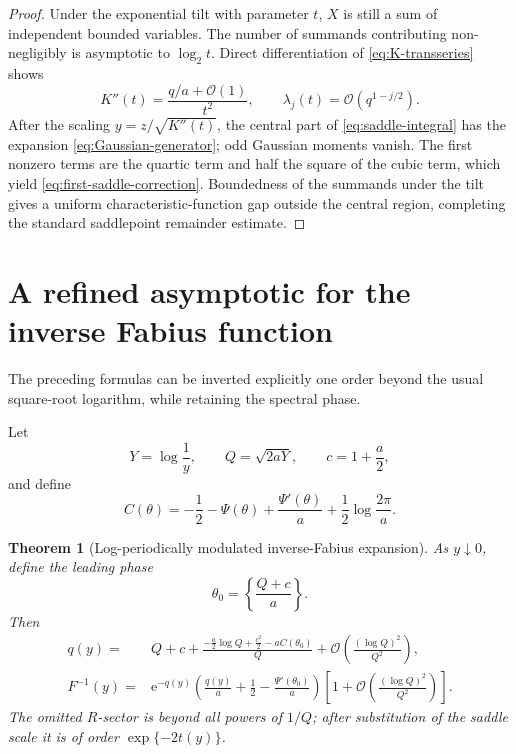 \documentclass[11pt,oneside]{article}
\newtheorem{theorem}{Theorem}[section]
\theoremstyle{definition}
\theoremstyle{remark}
\newcommand{\e}{\mathrm e}
\newcommand{\bigO}{\mathcal O}
\begin{document}
\begin{proof}
Under the exponential tilt with parameter \(t\), \(X\) is still a sum of
independent bounded variables.  The number of summands contributing
non-negligibly is asymptotic to \(\log_2t\).  Direct differentiation of
\eqref{eq:K-transseries} shows
\[
 K''(t)=\frac{q/a+\bigO(1)}{t^2},\qquad
 \lambda_j(t)=\bigO(q^{1-j/2}).
\]
After the scaling \(y=z/\sqrt{K''(t)}\), the central part of
\eqref{eq:saddle-integral} has the expansion
\eqref{eq:Gaussian-generator}; odd Gaussian moments vanish.  The first
nonzero terms are the quartic term and half the square of the cubic term,
which yield \eqref{eq:first-saddle-correction}.  Boundedness of the summands
under the tilt gives a uniform characteristic-function gap outside the
central region, completing the standard saddlepoint remainder estimate.
\end{proof}

\section{A refined asymptotic for the inverse Fabius function}

The preceding formulas can be inverted explicitly one order beyond the usual
square-root logarithm, while retaining the spectral phase.

Let
\[
 Y=\log\frac1y,\qquad
 Q=\sqrt{2aY},\qquad
 c=1+\frac a2,
\]
and define
\begin{equation}
 C(\theta)
 =-\frac12-\Psi(\theta)
   +\frac{\Psi'(\theta)}a
   +\frac12\log\frac{2\pi}{a}.
 \label{eq:Ctheta}
\end{equation}

\begin{theorem}[Log-periodically modulated inverse-Fabius expansion]
\label{thm:inverse-Fabius}
As \(y\downarrow0\), define the leading phase
\[
 \theta_0=
 \left\{\frac{Q+c}{a}\right\}.
\]
Then
\begin{align}
 q(y)
 ={}&
 Q+c+
 \frac{
  -\frac a2\log Q+\frac{c^2}{2}-aC(\theta_0)
 }{Q}
 +\bigO\!\left(\frac{(\log Q)^2}{Q^2}\right),
 \label{eq:q-inverse}\\
 F^{-1}(y)
 ={}&
 \e^{-q(y)}
 \left(
  \frac{q(y)}a+\frac12
  -\frac{\Psi'(\theta_0)}a
 \right)
 \left[
  1+\bigO\!\left(\frac{(\log Q)^2}{Q^2}\right)
 \right].
 \label{eq:F-inverse}
\end{align}
The omitted \(R\)-sector is beyond all powers of \(1/Q\); after substitution
of the saddle scale it is of order
\(\exp\{-2t(y)\}\).
\end{theorem}
\end{document}
